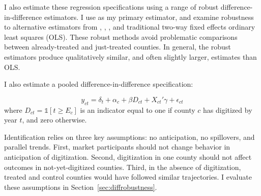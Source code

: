 \documentclass[11pt]{article}
\begin{document}
I also estimate these regression specifications using a range of robust difference-in-difference estimators. I use \citet{dechaisemartin2024} as my primary estimator, and examine robustness to alternative estimators from \citet{sun_estimating_2020}, \citet{borusyak2022revisiting}, \citet{callaway_2021}, and traditional two-way fixed effects ordinary least squares (OLS). These robust methods avoid problematic comparisons between already-treated and just-treated counties. In general, the robust estimators produce qualitatively similar, and often slightly larger, estimates than OLS.



I also estimate a pooled difference-in-difference specification: 

\begin{equation} \label{eq:didpooled}
y_{ct} = \delta_{t} + \alpha_{c} + \beta D_{ct} + X_{ct}'\gamma + \epsilon_{ct}
\end{equation}
where $D_{ct}=\mathds{1}[t \ge E_c]$ is an indicator equal to one if county $c$ has digitized by year $t$, and zero otherwise.

Identification relies on three key assumptions: no anticipation, no spillovers, and parallel trends. First, market participants should not change behavior in anticipation of digitization. Second, digitization in one county should not affect outcomes in not-yet-digitized counties. Third, in the absence of digitization, treated and control counties would have followed similar trajectories. I evaluate these assumptions in Section~\ref{sec:diffrobustness}.



\end{document}
